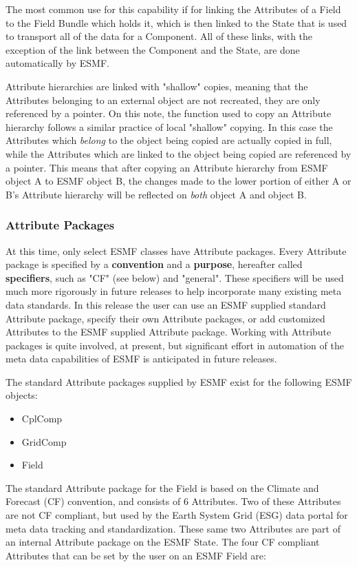 The most common use for this capability if for linking the Attributes of a Field to the Field Bundle which holds it, which is then linked to the State that is used to transport all of the data for a Component.  All of these links, with the exception of the link between the Component and the State, are done automatically by ESMF.  

Attribute hierarchies are linked with "shallow" copies, meaning that the Attributes belonging to an external object are not recreated, they are only referenced by a pointer.  On this note, the function used to copy an Attribute hierarchy follows a similar practice of local "shallow" copying.  In this case the Attributes which {\it belong} to the object being copied are actually copied in full, while the Attributes which are linked to the object being copied are referenced by a pointer.  This means that after copying an Attribute hierarchy from ESMF object A to ESMF object B, the changes made to the lower portion of either A or B's Attribute hierarchy will be reflected on {\it both} object A and object B.

\subsubsection{Attribute Packages}

At this time, only select ESMF classes have Attribute packages.  Every Attribute package is specified by a {\bf convention} and a {\bf purpose}, hereafter called {\bf specifiers}, such as "CF" (see below) and "general".  These specifiers will be used much more rigorously in future releases to help incorporate many existing meta data standards.  In this release the user can use an ESMF supplied standard Attribute package, specify their own Attribute packages, or add customized Attributes to the ESMF supplied Attribute package.  Working with Attribute packages is quite involved, at present, but significant effort in automation of the meta data capabilities of ESMF is anticipated in future releases. 

The standard Attribute packages supplied by ESMF exist for the following ESMF objects:

\begin{itemize}
\item CplComp
\item GridComp
\item Field
\end{itemize}

The standard Attribute package for the Field is based on the Climate and Forecast (CF) convention, and consists of 6 Attributes.  Two of these Attributes are not CF compliant, but used by the Earth System Grid (ESG) data portal for meta data tracking and standardization.  These same two Attributes are part of an internal Attribute package on the ESMF State.  The four CF compliant Attributes that can be set by the user on an ESMF Field are:

